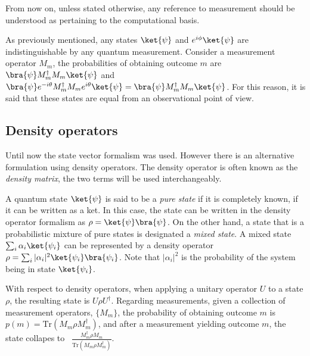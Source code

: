 From now on, unless stated otherwise, any reference to measurement should be understood as pertaining to the computational basis.

As previously mentioned, any states $\ket{\psi}$ and $e^{i\phi}\ket{\psi}$ are indistinguishable by any quantum measurement. Consider a measurement operator $M_m$, the probabilities of obtaining outcome $m$ are $\bra{\psi} M_{m}^{\dagger}M_{m}\ket{\psi}$ and $\bra{\psi} e^{-i \theta} M_{m}^{\dagger}M_{m}e^{i\theta}\ket{\psi}=\bra{\psi} M_{m}^{\dagger}M_{m}\ket{\psi}$. For this reason, it is said that these states are equal from an observational point of view.




\subsection{Density operators}
Until now the state vector formalism was used. However there is an alternative formulation using density operators. The density operator is often known as the \emph{density matrix}, the two terms will be used interchangeably.



A quantum state $\ket{\psi}$ is said to be a \emph{pure state} if it is completely known,  if it can be written as a ket. In this case, the state can be written in the density operator formalism as $\rho = \ket{\psi}\bra{\psi}$. On the other hand, a state that is a probabilistic mixture of pure states is designated a \emph{mixed state}. A mixed state $\sum_i \alpha_i \ket{\psi_i}$ can be represented by a density operator $\rho= \sum_i |\alpha_i|^{2}\ket{\psi_i}\bra{\psi_i}$. Note that $|\alpha_i|^{2}$ is the probability of the system being in state $\ket{\psi_i}$. 

With respect to density operators, when applying a unitary operator $U$ to a state $\rho$, the resulting state is $U\rho U^{\dag}$. Regarding measurements, given a collection of measurement operators, $\{M_{m}\}$, the probability of obtaining outcome $m$ is $p(m)=\text{Tr}(M_{m}\rho M_{m}^{\dag})$, and after a measurement yielding outcome $m$, the state collapes to  $\frac{M_{m}^{\dag}\rho M_{m}}{\text{Tr}(M_{m}\rho M_{m}^{\dag})}$.

